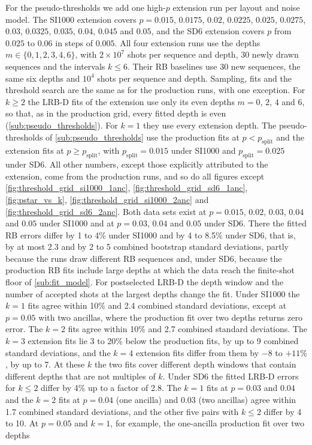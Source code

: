 For the pseudo-thresholds we add one high-$p$ extension run per layout and noise model. The SI1000 extension covers $p = 0.015$, $0.0175$, $0.02$, $0.0225$, $0.025$, $0.0275$, $0.03$, $0.0325$, $0.035$, $0.04$, $0.045$ and $0.05$, and the SD6 extension covers $p$ from $0.025$ to $0.06$ in steps of $0.005$. All four extension runs use the depths $m \in \{0, 1, 2, 3, 4, 6\}$, with $2\times10^7$ shots per sequence and depth, 30 newly drawn sequences and the intervals $k \le 6$. Their RB baselines use 30 new sequences, the same six depths and $10^4$ shots per sequence and depth. Sampling, fits and the threshold search are the same as for the production runs, with one exception. For $k \ge 2$ the LRB-D fits of the extension use only its even depths $m = 0$, $2$, $4$ and $6$, so that, as in the production grid, every fitted depth is even (\autoref{sub:pseudo_thresholds}). For $k = 1$ they use every extension depth. The pseudo-thresholds of \autoref{sub:pseudo_thresholds} use the production fits at $p < p_{\mathrm{split}}$ and the extension fits at $p \ge p_{\mathrm{split}}$, with $p_{\mathrm{split}} = 0.015$ under SI1000 and $p_{\mathrm{split}} = 0.025$ under SD6. All other numbers, except those explicitly attributed to the extension, come from the production runs, and so do all figures except \autoref{fig:threshold_grid_si1000_1anc}, \autoref{fig:threshold_grid_sd6_1anc}, \autoref{fig:pstar_vs_k}, \autoref{fig:threshold_grid_si1000_2anc} and \autoref{fig:threshold_grid_sd6_2anc}. Both data sets exist at $p = 0.015$, $0.02$, $0.03$, $0.04$ and $0.05$ under SI1000 and at $p = 0.03$, $0.04$ and $0.05$ under SD6. There the fitted RB errors differ by 1 to 4\% under SI1000 and by 4 to 8.5\% under SD6, that is, by at most 2.3 and by 2 to 5 combined bootstrap standard deviations, partly because the runs draw different RB sequences and, under SD6, because the production RB fits include large depths at which the data reach the finite-shot floor of \autoref{sub:fit_model}. For postselected LRB-D the depth window and the number of accepted shots at the largest depths change the fit. Under SI1000 the $k = 1$ fits agree within 10\% and 2.4 combined standard deviations, except at $p = 0.05$ with two ancillas, where the production fit over two depths returns zero error. The $k = 2$ fits agree within 10\% and 2.7 combined standard deviations. The $k = 3$ extension fits lie 3 to 20\% below the production fits, by up to 9 combined standard deviations, and the $k = 4$ extension fits differ from them by $-8$ to $+11\%$, by up to 7. At these $k$ the two fits cover different depth windows that contain different depths that are not multiples of $k$. Under SD6 the fitted LRB-D errors for $k \le 2$ differ by 4\% up to a factor of 2.8. The $k = 1$ fits at $p = 0.03$ and $0.04$ and the $k = 2$ fits at $p = 0.04$ (one ancilla) and $0.03$ (two ancillas) agree within 1.7 combined standard deviations, and the other five pairs with $k \le 2$ differ by 4 to 10. At $p = 0.05$ and $k = 1$, for example, the one-ancilla production fit over two depths 